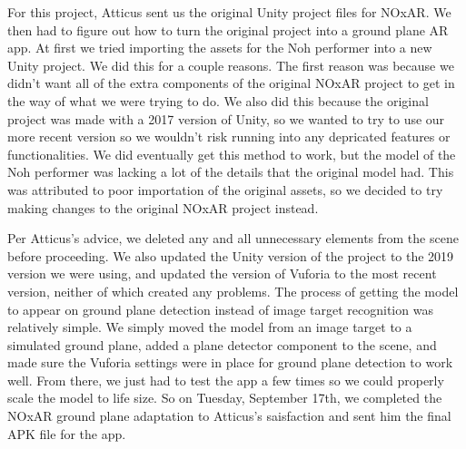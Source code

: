 \documentclass[a4paper, 10pt, american, titlepage]{article}
\begin{document}
For this project, Atticus sent us the original Unity project files for NOxAR.
We then had to figure out how to turn the original project into a ground plane
AR app. At first we tried importing the assets for the Noh performer into a new
Unity project. We did this for a couple reasons. The first reason was because
we didn't want all of the extra components of the original NOxAR project to
get in the way of what we were trying to do. We also did this because the 
original project was made with a 2017 version of Unity, so we wanted to try to
use our more recent version so we wouldn't risk running into any depricated 
features or functionalities. We did eventually get this method to work, but the
model of the Noh performer was lacking a lot of the details that the original 
model had. This was attributed to poor importation of the original assets, so 
we decided to try making changes to the original NOxAR project instead. 

Per Atticus's advice, we deleted any and all unnecessary elements from the 
scene before proceeding. We also updated the Unity version of the project to
the 2019 version we were using, and updated the version of Vuforia to the most
recent version, neither of which created any problems. The process of getting
the model to appear on ground plane detection instead of image target 
recognition was relatively simple. We simply moved the model from an image 
target to a simulated ground plane, added a plane detector component to the
scene, and made sure the Vuforia settings were in place for ground plane
detection to work well. From there, we just had to test the app a few times so
we could properly scale the model to life size. So on Tuesday, September 17th, 
we completed the NOxAR ground plane adaptation to Atticus's saisfaction and
sent him the final APK file for the app. 
\end{document}
